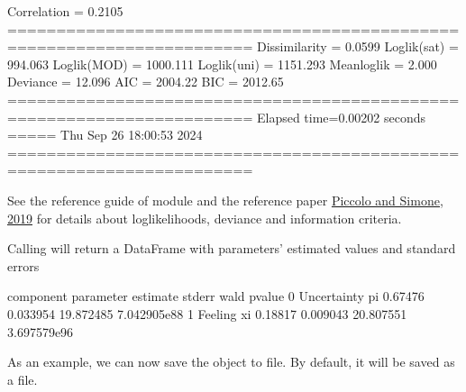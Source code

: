 \documentclass[letterpaper,10pt,english]{sphinxmanual}
\begin{document}
\begin{sphinxVerbatim}[commandchars=\\\{\}]
Correlation   = 0.2105
=======================================================================
Dissimilarity = 0.0599
Loglik(sat)   = \PYGZhy{}994.063
Loglik(MOD)   = \PYGZhy{}1000.111
Loglik(uni)   = \PYGZhy{}1151.293
Mean\PYGZhy{}loglik   = \PYGZhy{}2.000
Deviance      = 12.096
\PYGZhy{}\PYGZhy{}\PYGZhy{}\PYGZhy{}\PYGZhy{}\PYGZhy{}\PYGZhy{}\PYGZhy{}\PYGZhy{}\PYGZhy{}\PYGZhy{}\PYGZhy{}\PYGZhy{}\PYGZhy{}\PYGZhy{}\PYGZhy{}\PYGZhy{}\PYGZhy{}\PYGZhy{}\PYGZhy{}\PYGZhy{}\PYGZhy{}\PYGZhy{}\PYGZhy{}\PYGZhy{}\PYGZhy{}\PYGZhy{}\PYGZhy{}\PYGZhy{}\PYGZhy{}\PYGZhy{}\PYGZhy{}\PYGZhy{}\PYGZhy{}\PYGZhy{}\PYGZhy{}\PYGZhy{}\PYGZhy{}\PYGZhy{}\PYGZhy{}\PYGZhy{}\PYGZhy{}\PYGZhy{}\PYGZhy{}\PYGZhy{}\PYGZhy{}\PYGZhy{}\PYGZhy{}\PYGZhy{}\PYGZhy{}\PYGZhy{}\PYGZhy{}\PYGZhy{}\PYGZhy{}\PYGZhy{}\PYGZhy{}\PYGZhy{}\PYGZhy{}\PYGZhy{}\PYGZhy{}\PYGZhy{}\PYGZhy{}\PYGZhy{}\PYGZhy{}\PYGZhy{}\PYGZhy{}\PYGZhy{}\PYGZhy{}\PYGZhy{}\PYGZhy{}\PYGZhy{}
AIC = 2004.22
BIC = 2012.65
=======================================================================
Elapsed time=0.00202 seconds =====\PYGZgt{}\PYGZgt{}\PYGZgt{} Thu Sep 26 18:00:53 2024
=======================================================================
\end{sphinxVerbatim}

\noindent{}

\begin{DUlineblock}{0em}
\item[] 
\end{DUlineblock}

\sphinxAtStartPar
See  the reference guide
of  module and the reference paper
\hyperlink{cite.references:id3}{Piccolo and Simone, 2019}
for details about log\sphinxhyphen{}likelihoods,
deviance and information criteria.

\sphinxAtStartPar
Calling  will return a DataFrame with
parameters’ estimated values and standard errors

\begin{sphinxVerbatim}[commandchars=\\\{\}]
     component parameter  estimate    stderr       wald        pvalue
0  Uncertainty        pi   0.67476  0.033954  19.872485  7.042905e\PYGZhy{}88
1      Feeling        xi   0.18817  0.009043  20.807551  3.697579e\PYGZhy{}96
\end{sphinxVerbatim}
\label{\detokenize{manual:save-load-example}}
\sphinxAtStartPar
As an example, we can now save the  object to file. By default,
it will be saved as a  file.
\def\sphinxLiteralBlockLabel{\label{\detokenize{manual:id44}}}
\begin{sphinxVerbatim}[commandchars=\\\{\},numbers=left,firstnumber=1,stepnumber=1]
\end{sphinxVerbatim}
\end{document}
